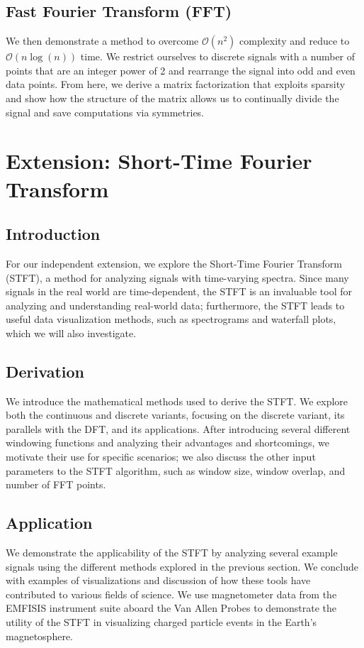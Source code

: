 \documentclass[10pt]{article}
\begin{document}
\subsection{Fast Fourier Transform (FFT)}
We then demonstrate a method to overcome $\mathcal{O}(n^2)$ complexity and reduce to $\mathcal{O}(n\log(n))$ time. We restrict ourselves to discrete signals with a number of points that are an integer power of 2 and rearrange the signal into odd and even data points. From here, we derive a matrix factorization that exploits sparsity and show how the structure of the matrix allows us to continually divide the signal and save computations via symmetries.   

\section{Extension: Short-Time Fourier Transform}

\subsection{Introduction}

For our independent extension, we explore the Short-Time Fourier Transform (STFT), a method for analyzing signals with time-varying spectra. \cite{allen_mills_2004_signal_analysis} Since many signals in the real world are time-dependent, the STFT is an invaluable tool for analyzing and understanding real-world data; furthermore, the STFT leads to useful data visualization methods, such as spectrograms and waterfall plots, which we will also investigate.

\subsection{Derivation} We introduce the mathematical methods used to derive the STFT. We explore both the continuous\cite{Gröchenig2001} and discrete\cite{STFT-presentation} variants, focusing on the discrete variant, its parallels with the DFT, and its applications. After introducing several different windowing functions and analyzing their advantages and shortcomings, we motivate their use for specific scenarios; we also discuss the other input parameters to the STFT algorithm, such as window size, window overlap, and number of FFT points.

\subsection{Application} We demonstrate the applicability of the STFT by analyzing several example signals using the different methods explored in the previous section. We conclude with examples of visualizations and discussion of how these tools have contributed to various fields of science.
We use magnetometer data from the EMFISIS instrument suite aboard the Van Allen Probes to demonstrate the utility of the STFT in visualizing charged particle events in the Earth's magnetosphere. \cite{kletzing_et_al_2012_EMFISIS}
\end{document}
